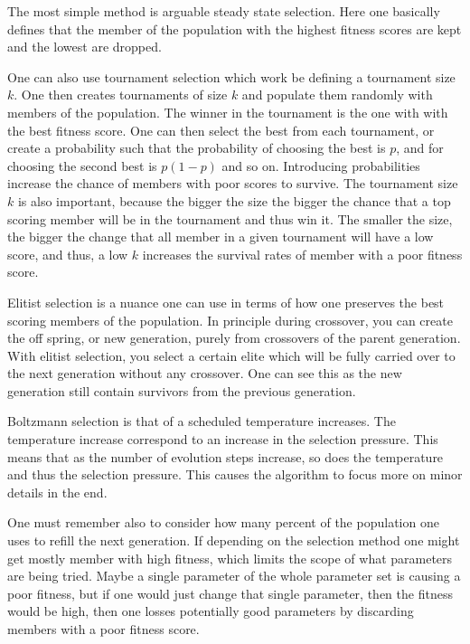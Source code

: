 \documentclass[12pt,a4paper]{article} %
\numberwithin{equation}{section}
\newcommand{\paa}[1]{\left(#1\right)}
\begin{document}
			The most simple method is arguable steady state selection. Here one basically defines that the member of the population with the highest fitness scores are kept and the lowest are dropped.
			
			One can also use tournament selection which work be defining a tournament size $k$. One then creates tournaments of size $k$ and populate them randomly with members of the population. The winner in the tournament is the one with with the best fitness score. One can then select the best from each tournament, or create a probability such that the probability of choosing the best is $p$, and for choosing the second best is $p\paa{1-p}$ and so on. Introducing probabilities increase the chance of members with poor scores to survive. The tournament size $k$ is also important, because the bigger the size the bigger the chance that a top scoring member will be in the tournament and thus win it. The smaller the size, the bigger the change that all member in a given tournament will have a low score, and thus, a low $k$ increases the survival rates of member with a poor fitness score.
			
			Elitist selection is a nuance one can use in terms of how one preserves the best scoring members of the population. In principle during crossover, you can create the off spring, or new generation, purely from crossovers of the parent generation. With elitist selection, you select a certain elite which will be fully carried over to the next generation without any crossover. One can see this as the new generation still contain survivors from the previous generation. 
			
			Boltzmann selection is that of a scheduled temperature increases. The temperature increase correspond to an increase in the selection pressure. This means that as the number of evolution steps increase, so does the temperature and thus the selection pressure. This causes the algorithm to focus more on minor details in the end.
			
			One must remember also to consider how many percent of the population one uses to refill the next generation. If depending on the selection method one might get mostly member with high fitness, which limits the scope of what parameters are being tried. Maybe a single parameter of the whole parameter set is causing a poor fitness, but if one would just change that single parameter, then the fitness would be high, then one losses potentially good parameters by discarding members with a poor fitness score.
			
\end{document}
